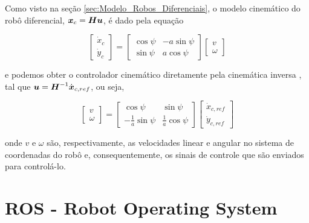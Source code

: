         Como visto na seção \ref{sec:Modelo_Robos_Diferenciais}, o modelo cinemático do robô diferencial, \( \boldsymbol{x}_c = \boldsymbol{H} \boldsymbol{u} \), é dado pela equação
        
        \begin{equation}
            \begin{bmatrix} \dot{x}_c \\ \dot{y}_c  \end{bmatrix} = \begin{bmatrix} \cos{\psi} & -a \sin{\psi} \\ \sin{\psi} & a \cos{\psi}   \end{bmatrix} \begin{bmatrix} v \\ \omega    \end{bmatrix}
            \label{eq:kinematics_differential_limo}
        \end{equation}
        
        e podemos obter o controlador cinemático diretamente pela cinemática inversa \cite{Sarcinelli-Filho2023_4}, tal que $\boldsymbol{u} = \boldsymbol{H}^{-1} \dot{\boldsymbol{x}}_{c,ref}$, ou seja,
        
        \begin{equation}
           \begin{bmatrix} v \\ \omega    \end{bmatrix}
           =  
           \begin{bmatrix} \cos{\psi} & \sin{\psi} \\ -\frac{1}{a}\sin{\psi} & \frac{1}{a} \cos{\psi}   \end{bmatrix} 
           \begin{bmatrix}\dot{x}_{c,ref} \\ \dot{y}_{c,ref}   \end{bmatrix}
           \label{eq:kinematic_controller_differential_limo}
        \end{equation}
        
        onde $v$ e $\omega$ são, respectivamente, as velocidades linear e angular no sistema de coordenadas do robô e, consequentemente, os sinais de controle que são enviados para controlá-lo.
    


\section{ROS - Robot Operating System}
\label{sec:ROS}


